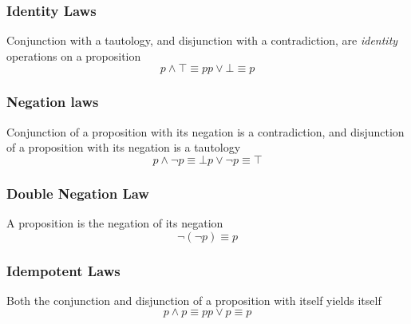 \documentclass[twocolumn]{report}
\begin{document}
\subsubsection{Identity Laws}
Conjunction with a tautology, and disjunction with a contradiction, are \textit{identity} operations on a proposition 
\begin{subequations}
\begin{equation}
	p \wedge \top \equiv p
	\label{eqn: conjunction-identity-law}
\end{equation}
\begin{equation}
	p \lor \bot \equiv p
	\label{eqn: disjuction-identity-law}
\end{equation}
\end{subequations}
\subsubsection{Negation laws}
Conjunction of a proposition with its negation is a contradiction, and disjunction of a proposition with its negation is a tautology
\begin{subequations}
	\begin{equation}
		p \wedge \neg p \equiv \bot
		\label{eqn: conjunction-negation-law}
	\end{equation}
	\begin{equation}
		p \lor \neg p \equiv \top
		\label{eqn: disjunction-negation-law}
	\end{equation}
\end{subequations}
\subsubsection{Double Negation Law}
A proposition is the negation of its negation
\begin{subequations}
	\begin{equation}
		\neg (\neg p) \equiv p
		\label{eqn: double-negation-law}
	\end{equation}
\end{subequations}
\subsubsection{Idempotent Laws}
Both the conjunction and disjunction of a proposition with itself yields itself
\begin{subequations}
	\begin{equation}
		p \wedge p \equiv p
		\label{eqn: idempotent-conjunction}
	\end{equation}
	\begin{equation}
		p \lor p \equiv p
		\label{eqn: idempotent-disjunction}
	\end{equation}
\end{subequations}
\end{document}
